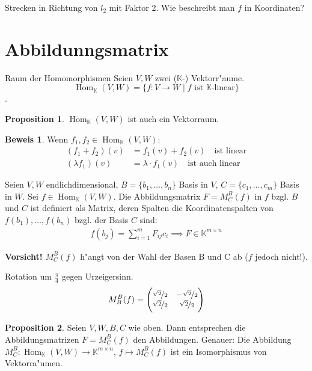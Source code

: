 \documentclass[oneside,fontsize=11pt,paper=a4,BCOR=0mm,DIV=12,automark,headsepline]{scrbook}
\DeclareMathOperator{\mHom}{Hom}
\theoremstyle{remark}
\theoremstyle{definition}
\newtheorem*{proposition}{Proposition}
\theoremstyle{definition}
\newtheorem*{prof}{Beweis}
\theoremstyle{remark}
\begin{document}
\begin{exa}
Strecken in Richtung von \(l_2\) mit Faktor 2. Wie beschreibt man \(f\) in
Koordinaten?
\end{exa}

\section{Abbildunngsmatrix}
\begin{definition}{Raum der Homomorphismen}{}
Seien \(V,W\) zwei (\(\mathbb{K}\)-) Vektorr"aume.
\[\mHom_\mathbb{K}(V,W) = \{f: V\to W \mid f \text{ ist }\mathbb{K}\text{-linear}\}\].
\end{definition}
\begin{proposition}
\(\mHom_\mathbb{K}(V,W)\) ist auch ein Vektorraum.
\end{proposition}
\begin{prof}
Wenn \(f_1, f_2 \in \mHom_\mathbb{K}(V,W)\):
\begin{align*}
(f_1 + f_2)(v) &= f_1(v) + f_2(v) \quad\text{ist linear} \\
(\lambda f_1)(v) &= \lambda\cdot f_1(v)\quad\text{ist auch linear}
\end{align*}
\end{prof}

Seien \(V, W\) endlichdimensional, \(B = \{b_1, \dots, b_n\}\) Basis in \(V\), \(C = \{c_1, \dots, c_m\}\) Basis in \(W\). Sei \(f \in \mHom_\mathbb{K}(V,W)\). Die Abbildungsmatrix \(F= M_C^B(f)\) in \(f\) bzgl. \(B\) und \(C\) ist definiert als
Matrix, deren Spalten die Koordinatenspalten von \(f(b_1),\dots, f(b_n)\) bzgl. der Basis \(C\) sind:
\begin{align*}
f(b_j) = \sum_{i=1}^mF_{ij}c_i \implies F \in \mathbb{K}^{m\times n}
\end{align*}

\textbf{Vorsicht!} \(M_C^B(f)\) h"angt von der Wahl der Basen B und C ab (\(f\) jedoch nicht!).

\begin{exa}
Rotation um \(\frac{\pi}{4}\) gegen Urzeigersinn.
\begin{align*}
M_B^B(f) = \begin{pmatrix}
\nicefrac{\sqrt{2}}{2} & -\nicefrac{\sqrt{2}}{2}\\
\nicefrac{\sqrt{2}}{2} & \nicefrac{\sqrt{2}}{2}
\end{pmatrix}
\end{align*}
\end{exa}

\begin{proposition} Seien \(V,W,B,C\) wie oben. Dann entsprechen die Abbildungsmatrizen
 \(F = M_C^B(f)\) den Abbildungen.  Genauer: Die Abbildung \(M_C^B: \mHom_\mathbb{K}(V,W)\to\mathbb{K}^{m\times n}\), \(f \mapsto M_C^B(f)\) ist ein Isomorphismus von
 Vektorra"umen.
\end{proposition}
\end{document}
